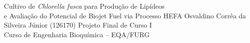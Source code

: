 \documentclass[12pt]{article}
\begin{document}
\capa
    {Cultivo de \textit{Chlorella fusca} para Produção de Lipídeos\\[0.3cm]
     e Avaliação do Potencial de Biojet Fuel via Processo HEFA}
    {Osvaldino Corrêa da Silveira Júnior (126170)}
    {Projeto Final de Curso I\\[0.2cm]
     Curso de Engenharia Bioquímica -- EQA/FURG}

\pagestyle{empty}
{
  \renewcommand{\contentsname}{\hfill\bfseries Sumário\hfill}
  \tableofcontents
}
\newpage
\pagestyle{fancy}








\end{document}
